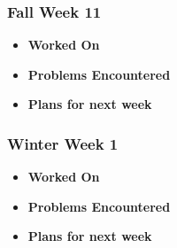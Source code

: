 \documentclass[compsoc,draftclsnofoot,onecolumn,10pt]{IEEEtran}
\begin{document}
\subsubsection{Fall Week 11}
\begin{itemize}
    \item {\textbf{Worked On}}
    \begin{itemize}

    \end{itemize}

    \item {\textbf{Problems Encountered}}
    \begin{itemize}

    \end{itemize}

    \item{\textbf{Plans for next week}}
    \begin{itemize}

    \end{itemize}

\end{itemize}

\subsubsection{Winter Week 1}
\begin{itemize}
    \item {\textbf{Worked On}}
    \begin{itemize}

    \end{itemize}

    \item {\textbf{Problems Encountered}}
    \begin{itemize}

    \end{itemize}

    \item{\textbf{Plans for next week}}
    \begin{itemize}

    \end{itemize}

\end{itemize}
\end{document}
